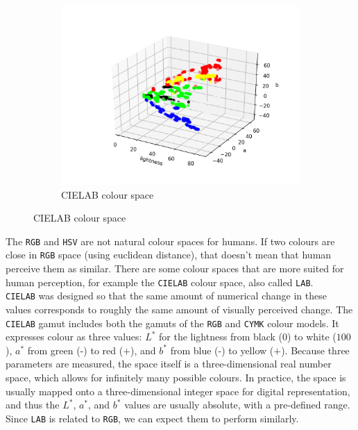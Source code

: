 \documentclass[12pt,a4paper]{article}
\begin{document}
\begin{center}
\begin{figure}[H]
\begin{subfigure}{.5\linewidth}
				\includegraphics[width=\linewidth]{images/lab_labels.png}
				\caption{CIELAB colour space}
			\end{subfigure}
		\end{figure}
	\end{center}
	
	The \texttt{RGB} and \texttt{HSV} are not natural colour spaces for humans. If two colours are close in \texttt{RGB} space (using euclidean distance), that doesn't mean that human perceive them as similar. There are some colour spaces that are more suited for human perception, for example the \texttt{CIELAB} colour space, also called \texttt{LAB}. \\

	\texttt{CIELAB} was designed so that the same amount of numerical change in these values corresponds to roughly the same amount of visually perceived change. The  \texttt{CIELAB} gamut includes both the gamuts of the \texttt{RGB} and \texttt{CYMK} colour models. It expresses colour as three values: $L^*$ for the lightness from black ($0$) to white ($100$), $a^*$ from green (-) to red ($+$), and $b^*$ from blue (-) to yellow ($+$). Because three parameters are measured, the space itself is a three-dimensional real number space, which allows for infinitely many possible colours. In practice, the space is usually mapped onto a three-dimensional integer space for digital representation, and thus the $L^*$, $a^*$, and $b^*$ values are usually absolute, with a pre-defined range. \\
	
	Since \texttt{LAB} is related to \texttt{RGB}, we can expect them to perform similarly.
\end{document}
